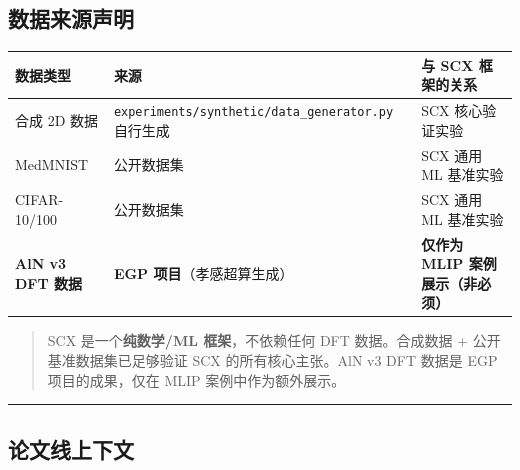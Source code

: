 \documentclass[
  12pt,
]{ctexart}
\begin{document}
\subsection{数据来源声明}\label{ux6570ux636eux6765ux6e90ux58f0ux660e}

\begin{longtable}[]{@{}
  >{\raggedright\arraybackslash}p{}
  >{\raggedright\arraybackslash}p{}
  >{\raggedright\arraybackslash}p{}@{}}
\toprule\noalign{}
\begin{minipage}[b]{\linewidth}\raggedright
数据类型
\end{minipage} & \begin{minipage}[b]{\linewidth}\raggedright
来源
\end{minipage} & \begin{minipage}[b]{\linewidth}\raggedright
与 SCX 框架的关系
\end{minipage} \\
\midrule\noalign{}
\endhead
\bottomrule\noalign{}
\endlastfoot
合成 2D 数据 & \texttt{experiments/synthetic/data\_generator.py}
自行生成 & SCX 核心验证实验 \\
MedMNIST & 公开数据集 & SCX 通用 ML 基准实验 \\
CIFAR-10/100 & 公开数据集 & SCX 通用 ML 基准实验 \\
\textbf{AlN v3 DFT 数据} & \textbf{EGP 项目}（孝感超算生成） &
\textbf{仅作为 MLIP 案例展示（非必须）} \\
\end{longtable}

\begin{quote}
SCX 是一个\textbf{纯数学/ML 框架}，不依赖任何 DFT 数据。合成数据 +
公开基准数据集已足够验证 SCX 的所有核心主张。AlN v3 DFT 数据是 EGP
项目的成果，仅在 MLIP 案例中作为额外展示。
\end{quote}

\begin{center}\rule{0.5\linewidth}{0.5pt}\end{center}

\subsection{论文线上下文}\label{ux8bbaux6587ux7ebfux4e0aux4e0bux6587}
\end{document}
